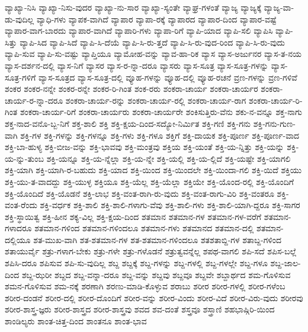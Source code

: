 {ವ್ಯಾಖ್ಯಾ-ನಿಸಿ
ವ್ಯಾಖ್ಯಾ-ನಿಸು-ವುದರ
ವ್ಯಾಖ್ಯಾ-ನು-ಸಾರ
ವ್ಯಾಖ್ಯಾ-ಸ್ಯಂತೇ
ವ್ಯಾಘ್ರ-ಗಳಂತೆ
ವ್ಯಾಜ್ಯ
ವ್ಯಾಜ್ಯಕ್ಕೆ
ವ್ಯಾಜ್ಯ-ವಾ-ಡು-ವುದಿಲ್ಲ
ವ್ಯಾಧಿ-ಗಳು
ವ್ಯಾಪಕ-ವಾಗಿದೆ
ವ್ಯಾಪಾರ
ವ್ಯಾಪಾ-ರಕ್ಕೆ
ವ್ಯಾಪಾರದ
ವ್ಯಾಪಾರ-ದಿಂದ
ವ್ಯಾಪಾರ-ವಷ್ಟೆ
ವ್ಯಾಪಾರ-ವಾಗ-ಬಾರದು
ವ್ಯಾಪಾರ-ವಾಗಿದೆ
ವ್ಯಾಪಾರಿ-ಗಳು
ವ್ಯಾಪಾ-ರಿಗೆ
ವ್ಯಾಪಿ-ಯಾದ
ವ್ಯಾಪಿ-ಸಲಿ
ವ್ಯಾಪಿಸಿ
ವ್ಯಾಪಿ-ಸಿತ್ತು
ವ್ಯಾಪಿ-ಸಿದ
ವ್ಯಾಪಿ-ಸಿದೆ
ವ್ಯಾಪಿ-ಸಿ-ದೆಯೆ
ವ್ಯಾಪಿ-ಸಿ-ರು-ತ್ತದೆ
ವ್ಯಾಪಿ-ಸಿ-ರು-ವುದ-ರಿಂದ
ವ್ಯಾಪಿ-ಸಿ-ರು-ವುದು
ವ್ಯಾಪಿ-ಸುವ
ವ್ಯಾಪಿ-ಸು-ವಷ್ಟು
ವ್ಯಾಪ್ತಿಯೂ
ವ್ಯಾಮೋಹ-ವನ್ನು
ವ್ಯಾವ-ಹಾ-ರಿಕ
ವ್ಯಾಸ
ವ್ಯಾಸ-ಅರ್ಜುನರ
ವ್ಯಾಸ-ತ-ನಯ
ವ್ಯಾಸ-ದರ್ಶನ-ದಲ್ಲಿ
ವ್ಯಾಸ-ನಿಗೆ
ವ್ಯಾಸರ
ವ್ಯಾಸ-ರ-ನ್ನಾ-ದರೂ
ವ್ಯಾಸರು
ವ್ಯಾಸ-ಸೂತ್ರ
ವ್ಯಾಸ-ಸೂತ್ರ-ಗಳನ್ನು
ವ್ಯಾಸ-ಸೂತ್ರ-ಗಳಿಗೆ
ವ್ಯಾಸ-ಸೂತ್ರದ
ವ್ಯಾಸ-ಸೂತ್ರ-ದಲ್ಲಿ
ವ್ಯೂಹ-ಗಳನ್ನು
ವ್ಯೂಹ-ದಲ್ಲಿ
ವ್ಯೂಹ-ರಚನೆ
ವ್ರಣ-ಗಳನ್ನು
ವ್ರಣ-ಗಳಿವೆ
ಶಂಕರ
ಶಂಕರ-ನನ್ನೇ
ಶಂಕರ-ರನ್ನೇ
ಶಂಕರ-ರಿ-ಗಿಂತ
ಶಂಕ-ರರು
ಶಂಕರಾ-ಚಾರ್ಯ
ಶಂಕರಾ-ಚಾರ್ಯರ
ಶಂಕರಾ-ಚಾರ್ಯ-ರ-ನ್ನಾ-ದರೂ
ಶಂಕರಾ-ಚಾರ್ಯ-ರನ್ನು
ಶಂಕರಾ-ಚಾರ್ಯ-ರಲ್ಲಿ
ಶಂಕರಾ-ಚಾರ್ಯ-ರಾಗ
ಶಂಕರಾ-ಚಾರ್ಯ-ರಿ-ಗಿಂತ
ಶಂಕರಾ-ಚಾರ್ಯ-ರಿಗೆ
ಶಂಕರಾ-ಚಾರ್ಯರು
ಶಂಕರಾ-ಚಾರ್ಯರೇ
ಶಂಕಿಸುತ್ತಿರು-ವೆನು
ಶಕು-ನ-ವನ್ನೂ
ಶಕ್ತ-ನಾಗು
ಶಕ್ತ-ನಾದ-ವನೊ-ಬ್ಬ-ನಿಗೆ
ಶಕ್ತ-ಶಾಲಿ
ಶಕ್ತಿ
ಶಕ್ತಿ-ಕ್ಷಯ-ದಿಂದ-ಸದ್ಯೋ-ನಿರ್ಮಿತ
ಶಕ್ತಿ-ಗಣಿ
ಶಕ್ತಿ-ಗನು
ಶಕ್ತಿ-ಗನು-ಗುಣ-ವಾಗಿ
ಶಕ್ತಿ-ಗಳ
ಶಕ್ತಿ-ಗಳನ್ನು
ಶಕ್ತಿ-ಗಳನ್ನೂ
ಶಕ್ತಿ-ಗಳು
ಶಕ್ತಿ-ಗಳೂ
ಶಕ್ತಿಗೆ
ಶಕ್ತಿ-ದಾಯಕ
ಶಕ್ತಿ-ಪೂರ್ಣ
ಶಕ್ತಿ-ಪೂರ್ಣ-ವಾದ
ಶಕ್ತಿ-ಬಾ-ಹುಳ್ಯ
ಶಕ್ತಿ-ಬೀಜ-ವನ್ನು
ಶಕ್ತಿ-ಭಾವವು
ಶಕ್ತಿ-ಮಂತ್ರವು
ಶಕ್ತಿಯ
ಶಕ್ತಿ-ಯಂತೆ
ಶಕ್ತಿ-ಯ-ನ್ನಿತ್ತು
ಶಕ್ತಿ-ಯನ್ನು
ಶಕ್ತಿ-ಯ-ನ್ನು-ತುಂಬ
ಶಕ್ತಿ-ಯನ್ನೂ
ಶಕ್ತಿ-ಯ-ನ್ನೆಲ್ಲಾ
ಶಕ್ತಿ-ಯ-ನ್ನೇ
ಶಕ್ತಿ-ಯಲ್ಲಿ
ಶಕ್ತಿ-ಯ-ಲ್ಲಿದೆ
ಶಕ್ತಿ-ಯಷ್ಟೇ
ಶಕ್ತಿ-ಯಾಗಲಿ
ಶಕ್ತಿ-ಯಾಗಿ
ಶಕ್ತಿ-ಯಾಗಿ-ರ-ಬಹುದು
ಶಕ್ತಿ-ಯಾದ
ಶಕ್ತಿ-ಯಿಂದ
ಶಕ್ತಿ-ಯಿಂದಲೇ
ಶಕ್ತಿ-ಯಿಂದಾ-ಗಲಿ
ಶಕ್ತಿ-ಯಿದೆ
ಶಕ್ತಿಯು
ಶಕ್ತಿ-ಯು-ತ-ವಾದದ್ದು
ಶಕ್ತಿ-ಯುಳ್ಳ
ಶಕ್ತಿಯೂ
ಶಕ್ತಿ-ಯೆಲ್ಲ
ಶಕ್ತಿ-ಯೆಲ್ಲಾ
ಶಕ್ತಿಯೇ
ಶಕ್ತಿ-ಯೊಂದ-ರಲ್ಲಿ
ಶಕ್ತಿ-ಯೊಂದಿಗೆ
ಶಕ್ತಿ-ಯೊಂದಿದೆ
ಶಕ್ತಿ-ಯೊಡನೆ
ಶಕ್ತಿ-ಲಾಭ
ಶಕ್ತಿ-ವಂತ-ರಾಗಿ-ರು-ವುದು
ಶಕ್ತಿ-ವಂತ-ರಾಗು-ವಿರಿ
ಶಕ್ತಿ-ವಂತರೂ
ಶಕ್ತಿ-ವಂತ-ರೆಂದು
ಶಕ್ತಿ-ವರ್ಧಕ
ಶಕ್ತಿ-ಶಾಲಿ
ಶಕ್ತಿ-ಶಾಲಿ-ಗಳಾಗು-ವೆವು
ಶಕ್ತಿ-ಶಾಲಿ-ಗಳು
ಶಕ್ತಿ-ಶಾಲಿ-ಯಾಗಿ-ದ್ದರೂ
ಶಕ್ತಿ-ಸಾಗರ
ಶಕ್ತಿ-ಸ್ಥಾಯಿತ್ವ
ಶಕ್ತಿ-ಹೀನ
ಶಕ್ಯ-ವಿಲ್ಲ
ಶಕ್ತಿ-ಕ್ಷಯ-ದಿಂದ
ಶತಮಾನ
ಶತಮಾನ-ಗಳ
ಶತಮಾನ-ಗಳ-ವರೆಗೆ
ಶತಮಾನ-ಗಳಾದರೂ
ಶತಮಾನ-ಗಳಿಂದ
ಶತಮಾನ-ಗಳಿಂದಲೂ
ಶತಮಾನ-ಗಳು
ಶತಮಾನದ
ಶತಮಾನ-ದಲ್ಲಿ
ಶತಮಾನ-ದಲ್ಲಿಯೂ
ಶತ-ಮುಖ-ವಾಗಿ
ಶತ-ಶತಮಾನ-ಗಳ
ಶತ-ಶತಮಾನ-ಗಳಿಂದಲೂ
ಶತಶತಾಬ್ದಿ-ಗಳ
ಶತಾಬ್ದ-ಗಳಿಂದ
ಶತಾಯುರ್ವೈ
ಶತ್ರು-ಗಳಾಗ-ಬೇಕು
ಶತ್ರು-ಗಳೇ
ಶತ್ರು-ಗಳೊಡನೆ
ಶತ್ರುತ್ವವನ್ನೆಲ್ಲ
ಶಪಥ-ವಾಗಲಿ
ಶಪಿ-ಸದೆ
ಶಪಿಸ-ಬಲ್ಲೆ
ಶಪಿಸಿ-ದರೂ
ಶಪಿಸುವ
ಶಪಿ-ಸು-ವುದಿಲ್ಲ
ಶಬ್ದ
ಶಬ್ದಕ್ಕೆ
ಶಬ್ದ-ಗಳನ್ನು
ಶಬ್ದ-ಗಳಲ್ಲಿ
ಶಬ್ದ-ಗಳಲ್ಲೇ
ಶಬ್ದ-ಗಳೂ
ಶಬ್ದ-ಜಾಲ-ದಿಂದ
ಶಬ್ದ-ಝರೀ
ಶಬ್ದದ
ಶಬ್ದ-ವನ್ನಾ-ದರೂ
ಶಬ್ದ-ವನ್ನು
ಶಬ್ದವು
ಶಬ್ದವೂ
ಶಬ್ದವೇ
ಶಬ್ದಾರ್ಥದ
ಶಮ-ಗೊಳಿಸುವ
ಶಮನ-ಗೊಳಿಸುವ
ಶಮ-ನಕ್ಕೆ
ಶರಣಾಗಿ
ಶರಣು-ಮಾಡಿ-ಕೊಳ್ಳುವ
ಶರಾಬು
ಶರೀರ
ಶರೀರ-ಗಳಲ್ಲಿ
ಶರೀರ-ಗಳೆಂಬ
ಶರೀರ-ದಂಡನೆ
ಶರೀರ-ದಲ್ಲಿ
ಶರೀರ-ದೊಂದಿಗೆ
ಶರೀರ-ವನ್ನು
ಶರೀರ-ವಿಂದು
ಶರೀರ-ವಿದೆ
ಶರೀರ-ವಿರು-ವುದು
ಶರೀರವು
ಶರೀರ-ಶಾಸ್ತ್ರ-ಜ್ಞರು
ಶರೀರ-ಶಾಸ್ತ್ರದ
ಶರೀರ-ಶಾಸ್ತ್ರವು
ಶವದ
ಶವ-ದಂತೆ
ಶಸ್ತ್ರವೂ
ಶಸ್ತ್ರಾಣಿ
ಶಹಭಾಷ್ಗಿರಿ-ಯಿಂದ
ಶಾಂಡಿಲ್ಯರು
ಶಾಂತ-ಚಿತ್ತ-ದಿಂದ
ಶಾಂತನೂ
ಶಾಂತ-ಭಾವ
}
